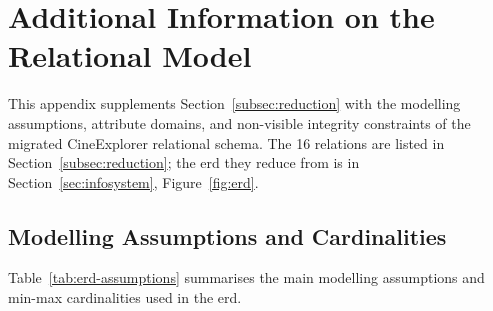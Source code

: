 \section{Additional Information on the Relational Model}
\label{sec:appendix-relational}

This appendix supplements Section~\ref{subsec:reduction} with the modelling assumptions, attribute domains, and non-visible integrity constraints of the migrated CineExplorer relational schema. The 16 relations are listed in Section~\ref{subsec:reduction}; the \ac{erd} they reduce from is in Section~\ref{sec:infosystem}, Figure~\ref{fig:erd}.

\subsection{Modelling Assumptions and Cardinalities}

Table~\ref{tab:erd-assumptions} summarises the main modelling assumptions and min-max cardinalities used in the \ac{erd}.

